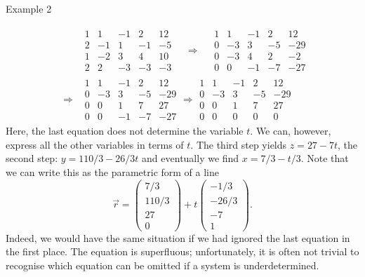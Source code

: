 \documentclass[
  letterpaper,
  DIV=11,
  numbers=noendperiod]{scrartcl}
\makeatletter
\let\oldsubparagraph\subparagraph
\renewcommand{\subparagraph}{
    \@ifstar
      \xxxSubParagraphStar
      \xxxSubParagraphNoStar
  }
\newcommand{\xxxSubParagraphStar}[1]{\oldsubparagraph*{#1}\mbox{}}
\newcommand{\xxxSubParagraphNoStar}[1]{\oldsubparagraph{#1}\mbox{}}
\theoremstyle{remark}
\makeatother
\begin{document}
\subparagraph{Example 2}\label{example-2-1}

\[\begin{aligned}
& &\begin{array}{rrrr|r}
 1 &   1& -1 & 2& 12  \\
 2 &  -1 & 1& -1 &-5 \\
1  &   -2& 3 & 4  & 10 \\
2 & 2 & -3 & -3 & -3    
\end{array}  \quad \Rightarrow \quad 
 \begin{array}{rrrr|r}
 1 &   1& -1 & 2& 12  \\
0&   -3 & 3& -5 &-29 \\
 0&  -3& 4 & 2  & -2 \\
  0&  0 &-1 & -7 & -27    
\end{array} \\
&\Rightarrow& \begin{array}{rrrr|r}
 1 &   1& -1 & 2& 12  \\
0&   -3 & 3& -5 &-29 \\
0& 0 & 1 & 7  & 27 \\
0& 0 & -1 & -7 & -27    
\end{array} \Rightarrow \begin{array}{rrrr|r}
1 &   1& -1 & 2& 12  \\
0&   -3 & 3& -5 &-29 \\
0& 0 & 1 & 7  & 27 \\
0 & 0 & 0 &  0 & 0    
\end{array} 
\end{aligned}\] Here, the last equation does not determine the variable
\(t\). We can, however, express all the other variables in terms of
\(t\). The third step yields \(z=27-7 t\), the second step:
\(y=110/3-26/3t\) and eventually we find \(x= 7/3-t/3\). Note that we
can write this as the parametric form of a line
\[\vec{r} = \scriptscriptstyle \begin{pmatrix}   7/3 \\ 110/3 \\ 27 \\ 0  \end{pmatrix} \textstyle + t \scriptscriptstyle \begin{pmatrix}   -1/3 \\ -26/3 \\ -7 \\ 1  \end{pmatrix} \textstyle  .\]
Indeed, we would have the same situation if we had ignored the last
equation in the first place. The equation is superfluous; unfortunately,
it is often not trivial to recognise which equation can be omitted if a
system is underdetermined.
\end{document}
